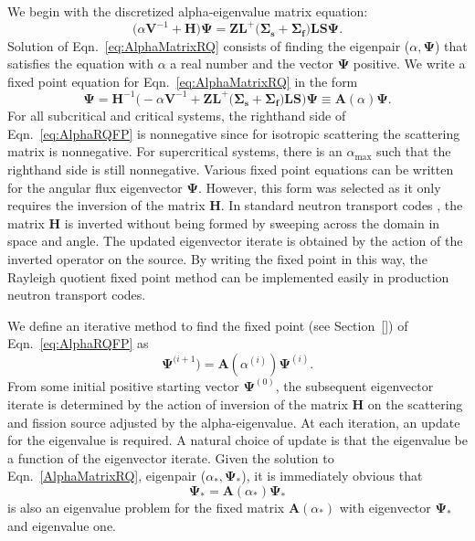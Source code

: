 We begin with the discretized alpha-eigenvalue matrix equation:
\begin{equation}
	\big ( \alpha \mathbf{V}^{-1} + \mathbf{H} \big ) \mathbf{\Psi} = \mathbf{Z} \mathbf{L}^{+} \big ( \mathbf{\Sigma_{s}} + \mathbf{\Sigma_{f}} \big ) \mathbf{L} \mathbf{S} \mathbf{\Psi}.
	\label{eq:AlphaMatrixRQ}
\end{equation}
Solution of Eqn.~\ref{eq:AlphaMatrixRQ} consists of finding the eigenpair ($\alpha,\mathbf{\Psi}$) that satisfies the equation with $\alpha$ a real number and the vector $\mathbf{\Psi}$ positive. We write a fixed point equation for Eqn.~\ref{eq:AlphaMatrixRQ} in the form
\begin{equation}
	\mathbf{\Psi} = \mathbf{H}^{-1} \big ( -\alpha \mathbf{V}^{-1} + \mathbf{Z} \mathbf{L}^{+} \big ( \mathbf{\Sigma_{s}} + \mathbf{\Sigma_{f}} \big ) \mathbf{L} \mathbf{S} \big ) \mathbf{\Psi} \equiv \mathbf{A}(\alpha) \mathbf{\Psi}.
	\label{eq:AlphaRQFP}
\end{equation}
For all subcritical and critical systems, the righthand side of Eqn.~\ref{eq:AlphaRQFP} is nonnegative since for isotropic scattering the scattering matrix is nonnegative. For supercritical systems, there is an $\alpha_{\text{max}}$ such that the righthand side is still nonnegative. Various fixed point equations can be written for the angular flux eigenvector $\mathbf{\Psi}$. However, this form was selected as it only requires the inversion of the matrix $\mathbf{H}$. In standard neutron transport codes \cite{hanebutte_ardra_1999} \cite{alcouffe2005partisn}, the matrix $\mathbf{H}$ is inverted without being formed by sweeping across the domain in space and angle. The updated eigenvector iterate is obtained by the action of the inverted operator on the source. By writing the fixed point in this way, the Rayleigh quotient fixed point method can be implemented easily in production neutron transport codes.

We define an iterative method to find the fixed point (see Section~\ref{}) of Eqn.~\ref{eq:AlphaRQFP} as
\begin{equation}
	\mathbf{\Psi}^{(i+1}) = \mathbf{A}(\alpha^{(i)}) \mathbf{\Psi}^{(i)}.
\end{equation}
From some initial positive starting vector $\mathbf{\Psi}^{(0)}$, the subsequent eigenvector iterate is determined by the action of inversion of the matrix $\mathbf{H}$ on the scattering and fission source adjusted by the alpha-eigenvalue. At each iteration, an update for the eigenvalue is required. A natural choice of update is that the eigenvalue be a function of the eigenvector iterate. Given the solution to Eqn.~\ref{AlphaMatrixRQ}, eigenpair ($\alpha_{*}, \mathbf{\Psi}_{*}$), it is immediately obvious that
\begin{equation}
	\mathbf{\Psi}_{*} =  \mathbf{A}(\alpha_{*}) \mathbf{\Psi}_{*}
\end{equation}
is also an eigenvalue problem for the fixed matrix $\mathbf{A}(\alpha_{*})$ with eigenvector $\mathbf{\Psi}_{*}$ and eigenvalue one.

